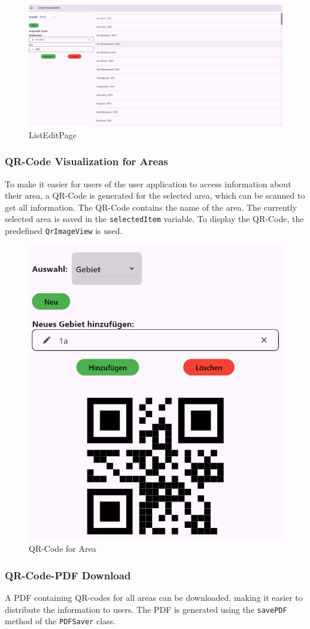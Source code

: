 \begin{figure}[H]
    \centering
    \includegraphics[width=0.9\linewidth]{images/AdminPanel/ListEditPage.png}
    \caption{ListEditPage}
\end{figure}

\subsubsection{QR-Code Visualization for Areas}
To make it easier for users of the user application to access information about their area, a QR-Code is generated for the selected area, which can be scanned to get all information. The QR-Code contains the name of the area. The currently selected area is saved in the \texttt{selectedItem} variable. To display the QR-Code, the predefined \texttt{QrImageView} is used.

\begin{figure}[H]
    \centering
    \includegraphics[width=0.4\linewidth]{images/AdminPanel/QrImageView.png}
    \caption{QR-Code for Area}
\end{figure}

\subsubsection{QR-Code-PDF Download}
A PDF containing  QR-codes for all areas can be downloaded, making it easier to distribute the information to users. The PDF is generated using the \texttt{savePDF} method of the \texttt{PDFSaver} class.\blankLine

